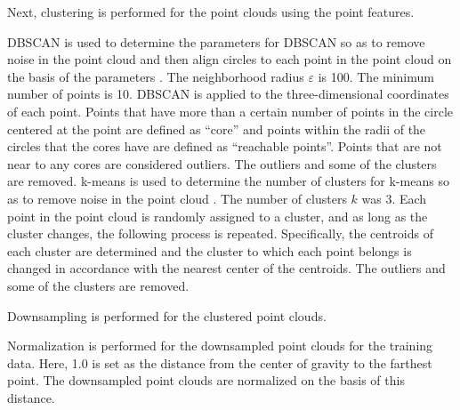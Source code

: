 Next, clustering is performed for the point clouds using the point features. 
  \begin{deletedblock}
  DBSCAN is used to determine the parameters for DBSCAN so as to remove noise in the point cloud and then align circles to each point in the point cloud on the basis of the parameters \cite{ester1996density}.
      The neighborhood radius $\varepsilon$ is 100. 
      The minimum number of points is 10. 
      DBSCAN is applied to the three-dimensional coordinates of each point. 
    Points that have more than a certain number of points in the circle centered at the point are defined as ``core'' and points within the radii of the circles that the cores have are defined as ``reachable points''. 
    Points that are not near to any cores are considered outliers. 
    The outliers and some of the clusters are removed. 
  k-means is used to determine the number of clusters for k-means so as to remove noise in the point cloud \cite{hartigan1979algorithm}. 
    The number of clusters $k$ was 3.
    Each point in the point cloud is randomly assigned to a cluster, and as long as the cluster changes, the following process is repeated. 
      Specifically, the centroids of each cluster are determined and the cluster to which each point belongs is changed in accordance with the nearest center of the centroids. 
    The outliers and some of the clusters are removed. 
  \end{deletedblock}

Downsampling is performed for the clustered point clouds. 

\begin{deletedblock}
Normalization is performed for the downsampled point clouds for the training data. 
  Here, 1.0 is set as the distance from the center of gravity to the farthest point. 
  The downsampled point clouds are normalized on the basis of this distance. 
\end{deletedblock}


